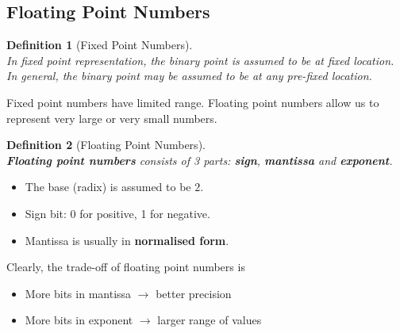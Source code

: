 \documentclass[12pt]{article}
\newtheorem{definition}{Definition}[section]
\theoremstyle{definition}
\begin{document}
\subsection{Floating Point Numbers}
\begin{definition}[Fixed Point Numbers]
\hfill\\\normalfont In fixed point representation, the binary point is assumed to be at fixed location.\\In general, the binary point may be assumed to be at any pre-fixed location.
\end{definition}
Fixed point numbers have limited range. Floating point numbers allow us to represent very large or very small numbers.
\begin{definition}[Floating Point Numbers]
\hfill\\\normalfont \textbf{Floating point numbers} consists of 3 parts: \textbf{sign}, \textbf{mantissa} and \textbf{exponent}.
\end{definition}
\begin{itemize}
  \item The base (radix) is assumed to be $2$.
  \item Sign bit: 0 for positive, 1 for negative.
  \item Mantissa is usually in \textbf{normalised form}.
\end{itemize}
Clearly, the trade-off of floating point numbers is
\begin{itemize}
  \item More bits in mantissa $\rightarrow$ better precision
  \item More bits in exponent $\rightarrow$ larger range of values
\end{itemize}
\end{document}
